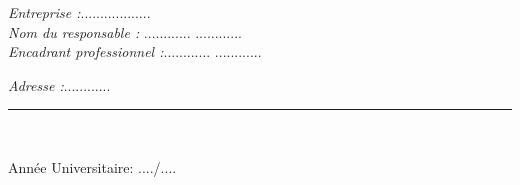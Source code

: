\begin{minipage}{0.9\textwidth}
  \begin{flushleft} \Large
  \emph{Entreprise :}.................. \\ %
  \vspace*{0.4cm}
  \emph{Nom du responsable :} ............ \textsc{............ } \\
  \vspace*{0.4cm}
\emph{Encadrant professionnel :}............ \textsc{............ } \\   
\vspace*{0.4cm}

\emph{Adresse :}............  \\
  \end{flushleft}
\end{minipage}%



\begin{center}
\vspace*{0.7cm}
\rule{45mm}{.3pt}\\
\vspace*{0.3cm}

{\large Année Universitaire: ..../....    \\ }
\end{center}
